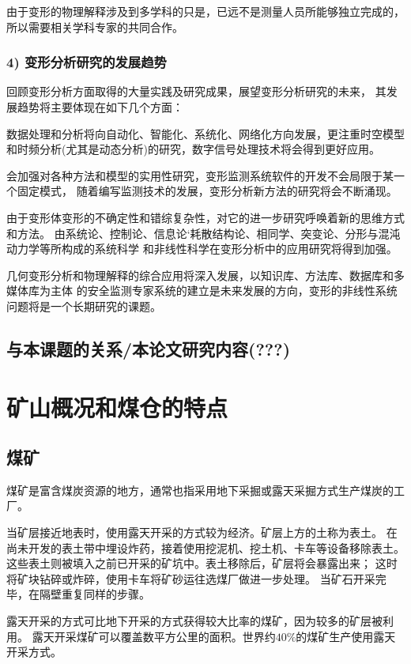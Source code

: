 由于变形的物理解释涉及到多学科的只是，已远不是测量人员所能够独立完成的，
所以需要相关学科专家的共同合作。

\subsubsection*{4) 变形分析研究的发展趋势}
回顾变形分析方面取得的大量实践及研究成果，展望变形分析研究的未来，
其发展趋势将主要体现在如下几个方面：
\begin{asparaitem}[$\bullet$]
\item 数据处理和分析将向自动化、智能化、系统化、网络化方向发展，更注重时空模型
和时频分析(尤其是动态分析)的研究，数字信号处理技术将会得到更好应用。
\item 会加强对各种方法和模型的实用性研究，变形监测系统软件的开发不会局限于某一个固定模式，
随着编写监测技术的发展，变形分析新方法的研究将会不断涌现。
\item 由于变形体变形的不确定性和错综复杂性，对它的进一步研究呼唤着新的思维方式和方法。
由系统论、控制论、信息论‘耗散结构论、相同学、突变论、分形与混沌动力学等所构成的系统科学
和非线性科学在变形分析中的应用研究将得到加强。
\item 几何变形分析和物理解释的综合应用将深入发展，以知识库、方法库、数据库和多媒体库为主体
的安全监测专家系统的建立是未来发展的方向，变形的非线性系统问题将是一个长期研究的课题。
\end{asparaitem}

\subsection{与本课题的关系/本论文研究内容(???)}

\section{矿山概况和煤仓的特点}
\subsection{煤矿}
煤矿是富含煤炭资源的地方，通常也指采用地下采掘或露天采掘方式生产煤炭的工厂。

当矿层接近地表时，使用露天开采的方式较为经济。矿层上方的土称为表土。
在尚未开发的表土带中埋设炸药，接着使用挖泥机、挖土机、卡车等设备移除表土。
这些表土则被填入之前已开采的矿坑中。表土移除后，矿层将会暴露出来；
这时将矿块钻碎或炸碎，使用卡车将矿砂运往选煤厂做进一步处理。
当矿石开采完毕，在隔壁重复同样的步骤。

露天开采的方式可比地下开采的方式获得较大比率的煤矿，因为较多的矿层被利用。
露天开采煤矿可以覆盖数平方公里的面积。世界约$40\%$的煤矿生产使用露天开采方式。

